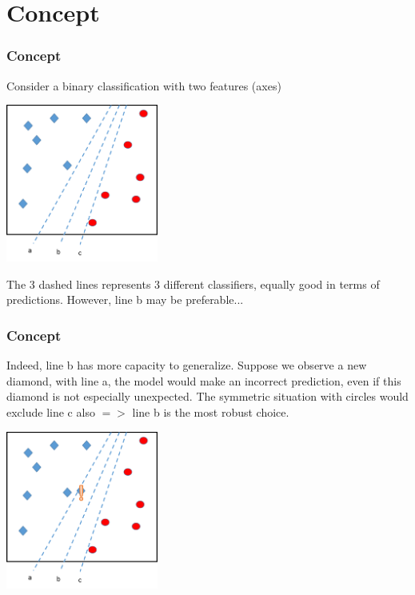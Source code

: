 \section{Concept}
\begin{frame}
\frametitle{Concept}
Consider a binary classification with two features (axes) 
\begin{center}
\includegraphics[width=5cm]{../../Graphs/SVM_Borders.png} 
\end{center}
The 3 dashed lines represents 3 different classifiers, equally good in terms of predictions. However, line b may be preferable...
\end{frame}
\begin{frame}
\frametitle{Concept}
Indeed, line b has more capacity to generalize. Suppose we observe a new diamond, with line a, the model would make an incorrect prediction, even if this diamond is not especially unexpected. The symmetric situation with circles would exclude line c also $=>$ line b is the most robust choice.
\begin{center}
\includegraphics[width=5cm]{../../Graphs/SVM_Borders_2.png} 
\end{center}
\end{frame}
